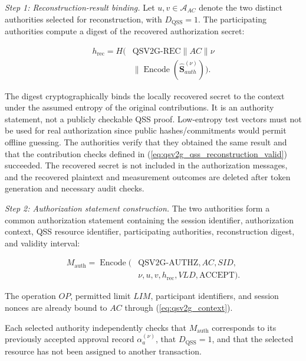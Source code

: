 \documentclass[twocolumn,10pt,journal]{IEEEtran}
\begin{document}
\textit{Step 1: Reconstruction-result binding.}
Let $u,v\in\mathcal{A}_{AC}$ denote the two distinct
authorities selected for reconstruction, with
$D_{\mathrm{QSS}}=1$. The participating authorities
compute a digest of the recovered authorization secret:

\begin{equation}
\begin{aligned}
h_{\mathrm{rec}}
=
H\big(
&\mathrm{QSV2G\mbox{-}REC}
\parallel AC\parallel\nu\\
&\parallel
\operatorname{Encode}
(\widehat{\mathbf{S}}_{auth}^{(\nu)})
\big).
\end{aligned}
\label{eq:qsv2g_reconstruction_digest}
\end{equation}

The digest cryptographically binds the locally recovered secret to
the context under the assumed entropy of the original contributions.
It is an authority statement, not a publicly checkable QSS proof.
Low-entropy test vectors must not be used for real authorization
since public hashes/commitments would permit offline guessing.
The authorities verify that they obtained the same
result and that the contribution checks defined in
(\ref{eq:qsv2g_qss_reconstruction_valid}) succeeded.
The recovered secret is not included in the
authorization messages, and the recovered plaintext and measurement
outcomes are deleted after token generation and necessary audit checks.

\textit{Step 2: Authorization statement construction.}
The two authorities form a common authorization
statement containing the session identifier,
authorization context, QSS resource identifier,
participating authorities, reconstruction digest,
and validity interval:

\begin{equation}
\begin{aligned}
M_{\mathrm{auth}}
=
\operatorname{Encode}\big(
&\mathrm{QSV2G\mbox{-}AUTHZ},AC,SID,\\
&\nu,u,v,h_{\mathrm{rec}},VLD,
\mathrm{ACCEPT}
\big).
\end{aligned}
\label{eq:qsv2g_authorization_statement}
\end{equation}

The operation $OP$, permitted limit $LIM$,
participant identifiers, and session nonces
are already bound to $AC$ through
(\ref{eq:qsv2g_context}).

Each selected authority independently checks
that $M_{\mathrm{auth}}$ corresponds to its
previously accepted approval record
$\alpha_a^{(\nu)}$, that $D_{\mathrm{QSS}}=1$,
and that the selected resource has not been
assigned to another transaction.
\end{document}
